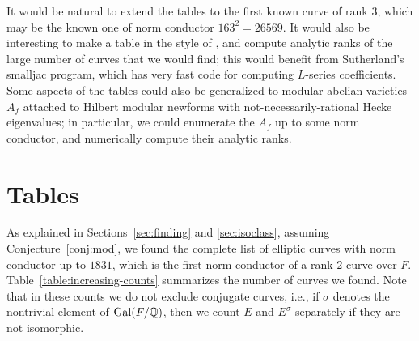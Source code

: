 \documentclass{amsart}
\begin{document}
It would be natural to extend the tables to the first known curve of
rank $3$, which may be the known one of norm conductor $163^2=26569$.
It would also be interesting to make a table in the style of
\cite{stein-watkins:ants5}, and compute analytic ranks of the large
number of curves that we would find; this would benefit from
Sutherland's smalljac program, which has very fast code for computing
$L$-series coefficients.  Some aspects of the tables could also be
generalized to modular abelian varieties $A_f$ attached to Hilbert
modular newforms with not-necessarily-rational Hecke eigenvalues; in
particular, we could enumerate the $A_f$ up to some norm conductor,
and numerically compute their analytic ranks.

\section{Tables}\label{sec:tables}

As explained in Sections~\ref{sec:finding} and \ref{sec:isoclass},
assuming Conjecture~\ref{conj:mod}, we found the complete list of
elliptic curves with norm conductor up to $1831$, which is the first
norm conductor of a rank $2$ curve over $F$.  Table~\ref{table:increasing-counts}
summarizes the number of curves we found.  Note that in these counts
we do not exclude conjugate curves, i.e., if $\sigma$ denotes the
nontrivial element of $\operatorname{Gal}(F/\mathbb{Q})$, then we count $E$ and $E^{\sigma}$
separately if they are not isomorphic.  
\end{document}
